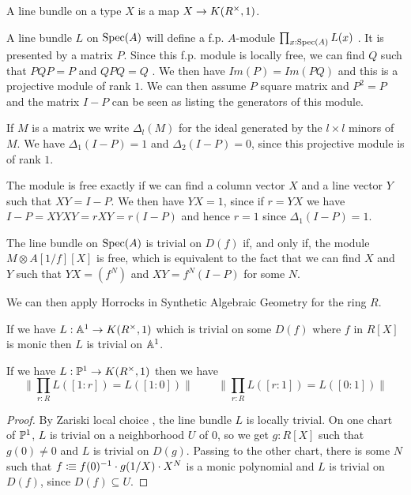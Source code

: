 A line bundle on a type $X$ is a map $X\rightarrow K(R^{\times},1)$.


\medskip

 A line bundle $L$ on $\operatorname{Spec}(A)$ will define a f.p. $A$-module $\prod_{x:\operatorname{Spec}(A)}L(x)$ \cite{draft}.
It is presented by a matrix $P$.
Since this f.p. module is locally free, we can find $Q$ such that $PQP = P$ and
$QPQ = Q$ \cite{lombardi-quitte}. We then have $Im(P) = Im(PQ)$ and this is a projective module of rank $1$. We can then assume $P$ square matrix and
$P^2 = P$ and the matrix $I-P$ can  be seen as listing the generators of this module.

If $M$ is a matrix we write $\Delta_l(M)$ for the ideal generated by the $l\times l$ minors of
$M$. We have $\Delta_1(I-P) = 1$ and $\Delta_2(I-P) = 0$, since this projective module is of rank $1$.

The module is free exactly if we can find a column vector $X$ and a line vector $Y$ such that
$XY = I-P$. We then have $YX = 1$, since if $r = YX$ we have $I-P = XYXY = rXY = r(I-P)$ and
hence $r = 1$ since $\Delta_1(I-P) = 1$.



\medskip


The line bundle on $\operatorname{Spec}(A)$ is trivial on $D(f)$ if, and only if, the module $M\otimes A[1/f][X]$ is free, which
is equivalent to the fact that we can find $X$ and $Y$ such that $YX = (f^N)$ and $XY = f^N(I-P)$ for some $N$.

We can then apply Horrocks  in Synthetic Algebraic Geometry for the ring $R$.

\begin{proposition}
  If we have $L:\mathbb{A}^1\rightarrow K(R^{\times},1)$ which is trivial on some $D(f)$ where $f$ in $R[X]$ is monic
  then $L$ is trivial on $\mathbb{A}^1$.
\end{proposition}

\begin{corollary}\label{c1}
  If we have $L:\mathbb{P}^1\rightarrow K(R^{\times},1)$ then we have
  $$\|{\prod_{r:R}L([1:r]) = L([1:0])}\|\,\,\,\,\,\,\,\,\,\,\,\,\,\|{\prod_{r:R}L([r:1]) = L([0:1])}\|$$
\end{corollary}

\begin{proof}
  By Zariski local choice \cite{draft}, the line bundle $L$ is locally trivial.
  On one chart of $\mathbb{P}^1$, $L$ is trivial on a neighborhood $U$ of $0$, so we get $g:R[X]$ such that $g(0)\neq 0$ and $L$ is trivial on $D(g)$.
  Passing to the other chart, there is some $N$ such that $f\vcentcolon\mspace{-1.2mu}\equiv f(0)^{-1}\cdot g(1/X)\cdot X^N$ is a monic polynomial and $L$ is trivial on $D(f)$,
  since $D(f)\subseteq U$.
\end{proof}


